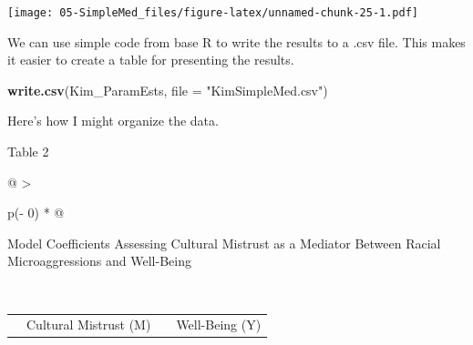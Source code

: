\documentclass[
  11pt,
]{book}
\newenvironment{Shaded}{\begin{snugshade}}{\end{snugshade}}
\newcommand{\AttributeTok}[1]{\textcolor[rgb]{0.27,0.27,0.27}{#1}}
\newcommand{\FunctionTok}[1]{\textcolor[rgb]{0.27,0.27,0.27}{\textbf{#1}}}
\newcommand{\NormalTok}[1]{#1}
\newcommand{\StringTok}[1]{\textcolor[rgb]{0.5,0.5,0.5}{#1}}
\begin{document}
\texttt{[image: 05-SimpleMed\_files/figure-latex/unnamed-chunk-25-1.pdf]}

We can use simple code from base R to write the results to a .csv file. This makes it easier to create a table for presenting the results.

\begin{Shaded}
\begin{Highlighting}[]
\FunctionTok{write.csv}\NormalTok{(Kim\_ParamEsts, }\AttributeTok{file =} \StringTok{"KimSimpleMed.csv"}\NormalTok{)}
\end{Highlighting}
\end{Shaded}

Here's how I might organize the data.

Table 2

\begin{longtable}[]{@{}
  >{\raggedright\arraybackslash}p{(\columnwidth - 0\tabcolsep) * }@{}}
\toprule\noalign{}
\begin{minipage}[b]{\linewidth}\raggedright
Model Coefficients Assessing Cultural Mistrust as a Mediator Between Racial Microaggressions and Well-Being
\end{minipage} \\
\midrule\noalign{}
\endhead
\bottomrule\noalign{}
\endlastfoot
\end{longtable}

\begin{longtable}[]{@{}
  >{\raggedright\arraybackslash}p{}
  >{\centering\arraybackslash}p{}
  >{\centering\arraybackslash}p{}
  >{\centering\arraybackslash}p{}@{}}
\toprule\noalign{}
\endhead
\bottomrule\noalign{}
\endlastfoot
& Cultural Mistrust (M) & & Well-Being (Y) \\
\end{longtable}
\end{document}
